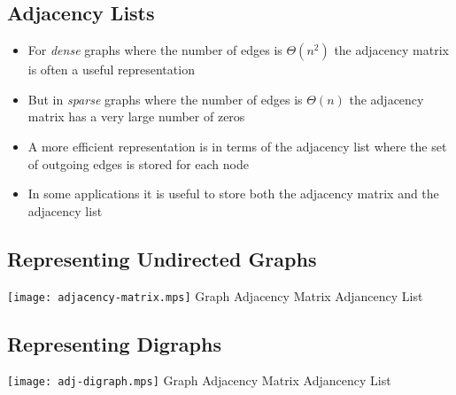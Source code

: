 \begin{slide}
\section{Adjacency Lists}

\begin{PauseHighLight}
  \begin{itemize}
  \item For \emph{dense} graphs where the number of edges is $\Theta(n^2)$
    the adjacency matrix is often a useful representation\pause
  \item But in \emph{sparse} graphs where the number of edges is $\Theta(n)$
    the adjacency matrix has a very large number of zeros\pause
  \item A more efficient representation is in terms of the adjacency
    list where the set of outgoing edges is stored for each node\pause
  \item In some applications it is useful to store both the adjacency
    matrix and the adjacency list\pause
  \end{itemize}
\end{PauseHighLight}

\end{slide}



\begin{slide}
\section{Representing Undirected Graphs}

\begin{center}
  \texttt{[image: adjacency-matrix.mps]}
  Graph \hfil\hfil Adjacency Matrix \hfil Adjancency List
\end{center}

\end{slide}


\begin{slide}
\section{Representing Digraphs}

\begin{center}
  \texttt{[image: adj-digraph.mps]}
  Graph \hfil\hfil Adjacency Matrix \hfil Adjancency List
\end{center}

\end{slide}


